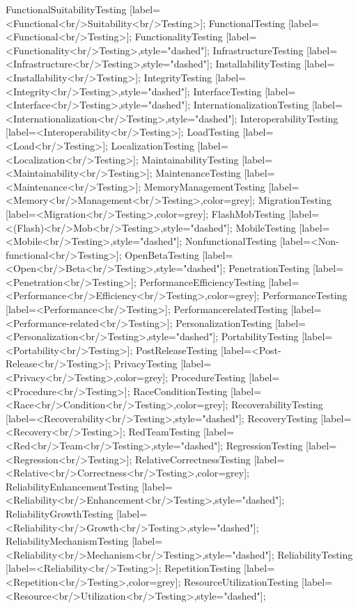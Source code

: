 \documentclass{article}
\begin{document}
{FunctionalSuitabilityTesting [label=<Functional<br/>Suitability<br/>Testing>];
FunctionalTesting [label=<Functional<br/>Testing>];
FunctionalityTesting [label=<Functionality<br/>Testing>,style="dashed"];
InfrastructureTesting [label=<Infrastructure<br/>Testing>,style="dashed"];
InstallabilityTesting [label=<Installability<br/>Testing>];
IntegrityTesting [label=<Integrity<br/>Testing>,style="dashed"];
InterfaceTesting [label=<Interface<br/>Testing>,style="dashed"];
InternationalizationTesting [label=<Internationalization<br/>Testing>,style="dashed"];
InteroperabilityTesting [label=<Interoperability<br/>Testing>];
LoadTesting [label=<Load<br/>Testing>];
LocalizationTesting [label=<Localization<br/>Testing>];
MaintainabilityTesting [label=<Maintainability<br/>Testing>];
MaintenanceTesting [label=<Maintenance<br/>Testing>];
MemoryManagementTesting [label=<Memory<br/>Management<br/>Testing>,color=grey];
MigrationTesting [label=<Migration<br/>Testing>,color=grey];
FlashMobTesting [label=<(Flash)<br/>Mob<br/>Testing>,style="dashed"];
MobileTesting [label=<Mobile<br/>Testing>,style="dashed"];
NonfunctionalTesting [label=<Non-functional<br/>Testing>];
OpenBetaTesting [label=<Open<br/>Beta<br/>Testing>,style="dashed"];
PenetrationTesting [label=<Penetration<br/>Testing>];
PerformanceEfficiencyTesting [label=<Performance<br/>Efficiency<br/>Testing>,color=grey];
PerformanceTesting [label=<Performance<br/>Testing>];
PerformancerelatedTesting [label=<Performance-related<br/>Testing>];
PersonalizationTesting [label=<Personalization<br/>Testing>,style="dashed"];
PortabilityTesting [label=<Portability<br/>Testing>];
PostReleaseTesting [label=<Post-Release<br/>Testing>];
PrivacyTesting [label=<Privacy<br/>Testing>,color=grey];
ProcedureTesting [label=<Procedure<br/>Testing>];
RaceConditionTesting [label=<Race<br/>Condition<br/>Testing>,color=grey];
RecoverabilityTesting [label=<Recoverability<br/>Testing>,style="dashed"];
RecoveryTesting [label=<Recovery<br/>Testing>];
RedTeamTesting [label=<Red<br/>Team<br/>Testing>,style="dashed"];
RegressionTesting [label=<Regression<br/>Testing>];
RelativeCorrectnessTesting [label=<Relative<br/>Correctness<br/>Testing>,color=grey];
ReliabilityEnhancementTesting [label=<Reliability<br/>Enhancement<br/>Testing>,style="dashed"];
ReliabilityGrowthTesting [label=<Reliability<br/>Growth<br/>Testing>,style="dashed"];
ReliabilityMechanismTesting [label=<Reliability<br/>Mechanism<br/>Testing>,style="dashed"];
ReliabilityTesting [label=<Reliability<br/>Testing>];
RepetitionTesting [label=<Repetition<br/>Testing>,color=grey];
ResourceUtilizationTesting [label=<Resource<br/>Utilization<br/>Testing>,style="dashed"];
}
\end{document}
